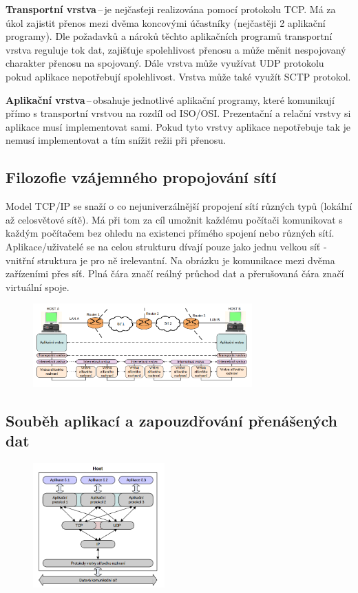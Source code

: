 \textbf{Transportní vrstva}\,--\,je nejčasťeji realizována pomocí protokolu TCP. Má za úkol zajistit přenos mezi dvěma koncovými účastníky (nejčastěji 2 aplikační programy).
Dle požadavků a nároků těchto aplikačních programů transportní vrstva reguluje tok dat, zajišťuje spolehlivost přenosu a může měnit nespojovaný charakter přenosu na spojovaný.
Dále vrstva může využívat UDP protokolu pokud aplikace nepotřebují spolehlivost.
Vrstva může také využít SCTP protokol.

\textbf{Aplikační vrstva}\,--\,obsahuje jednotlivé aplikační programy, které komunikují přímo s transportní vrstvou na rozdíl od ISO/OSI.
Prezentační a relační vrstvy si aplikace musí implementovat sami.
Pokud tyto vrstvy aplikace nepotřebuje tak je nemusí implementovat a tím snížit režii při přenosu.

\subsection{Filozofie vzájemného propojování sítí}

Model TCP/IP se snaží o co nejuniverzálnější propojení sítí různých typů (lokální až celosvětové sítě).
Má při tom za cíl umožnit každému počítači komunikovat s každým počítačem bez ohledu na existenci přímého spojení nebo různých sítí.
Aplikace/uživatelé se na celou strukturu dívají pouze jako jednu velkou síť - vnitřní struktura je pro ně irelevantní.
Na obrázku je komunikace mezi dvěma zařízeními přes síť.
Plná čára značí reálný průchod dat a přerušovaná čára značí virtuální spoje.

\begin{figure}[!h]
    \centering
    \includegraphics[width=0.75\textwidth]{obrazky/011.png}
\end{figure}

\subsection{Souběh aplikací a zapouzdřování přenášených dat}

\begin{figure}[!h]
    \centering
    \includegraphics[width=0.45\textwidth]{obrazky/012.png}
\end{figure}


